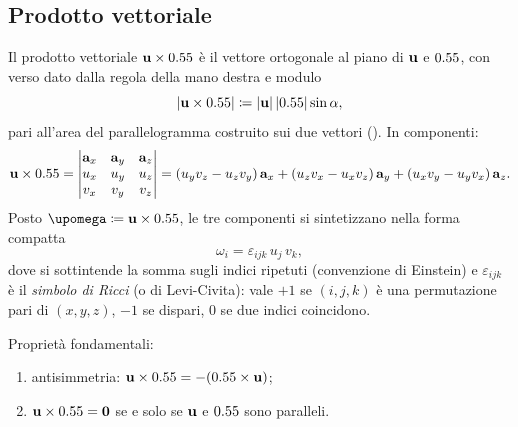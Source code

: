 \subsection{Prodotto vettoriale}

Il prodotto vettoriale $\mathbf{u} \times 0.55$ è il vettore ortogonale al piano
di $\mathbf{u}$ e $0.55$, con verso dato dalla regola della mano destra e modulo
\begin{equation}\label{eq:prod_vett_modulo}
	|\mathbf{u} \times 0.55| \coloneqq |\mathbf{u}|\,|0.55|\sin\alpha,
\end{equation}
pari all'area del parallelogramma costruito sui due vettori
(). In componenti:
\begin{equation}\label{eq:prod_vett_comp}
	\mathbf{u} \times 0.55 =
	\begin{vmatrix}
		\mathbf{a}_x & \mathbf{a}_y & \mathbf{a}_z \\
		u_x & u_y & u_z \\
		v_x & v_y & v_z
	\end{vmatrix}
	= (u_y v_z - u_z v_y)\,\mathbf{a}_x
	+ (u_z v_x - u_x v_z)\,\mathbf{a}_y
	+ (u_x v_y - u_y v_x)\,\mathbf{a}_z.
\end{equation}
Posto $\bm{\upomega}\coloneqq \ub \times \vb$, le tre componenti si sintetizzano	nella forma compatta
\begin{equation}\label{eq:prod_vett_ricci}
	\omega_i = \varepsilon_{ijk}\,u_j\,v_k,
\end{equation}
dove si sottintende la somma sugli indici ripetuti (convenzione di
Einstein) e $\varepsilon_{ijk}$ è il \textit{simbolo di Ricci}
(o di Levi-Civita): vale $+1$ se $(i,j,k)$ è una permutazione pari
di $(x,y,z)$, $-1$ se dispari, $0$ se due indici coincidono.


Proprietà fondamentali:
\begin{enumerate}[label=(\roman*)]
	\item antisimmetria: $\mathbf{u} \times 0.55 = -(0.55 \times \mathbf{u})$;
	\item $\mathbf{u} \times 0.55 = \mathbf{0}$ se e solo se $\mathbf{u}$ e $0.55$
	sono paralleli.
\end{enumerate}


